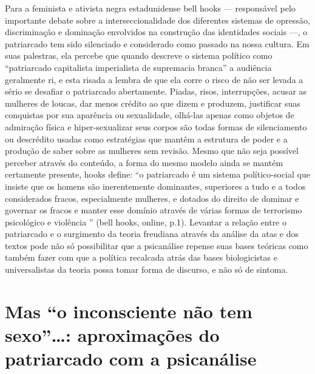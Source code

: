 Para a feminista e ativista negra estadunidense bell hooks --- responsável
pelo importante debate sobre a interseccionalidade dos diferentes
sistemas de opressão, discriminação e dominação envolvidos na construção
das identidades sociais ---, o patriarcado tem sido silenciado e
considerado como passado na nossa cultura. Em suas palestras, ela
percebe que quando descreve o sistema político como ``patriarcado
capitalista imperialista de supremacia branca'' a audiência geralmente
ri, e esta risada a lembra de que ela corre o risco de não ser levada a
sério se desafiar o patriarcado abertamente. Piadas, risos,
interrupções, acusar as mulheres de loucas, dar menos crédito ao que
dizem e produzem, justificar suas conquistas por sua aparência ou
sexualidade, olhá-las apenas como objetos de admiração física e
hiper-sexualizar seus corpos são todas formas de silenciamento ou
descrédito usadas como estratégias que mantêm a estrutura de poder e a
produção de saber sobre as mulheres sem revisão. Mesmo que não seja
possível perceber através do conteúdo, a forma do mesmo modelo ainda se
mantém certamente presente, hooks define: ``o patriarcado é um sistema
político-social que insiste que os homens são inerentemente dominantes,
superiores a tudo e a todos considerados fracos, especialmente mulheres,
e dotados do direito de dominar e governar os fracos e manter esse
domínio através de várias formas de terrorismo psicológico e violência
'' (bell hooks, online, p.1). Levantar a relação entre o patriarcado e o
surgimento da teoria freudiana através da análise da atas e dos textos
pode não só possibilitar que a psicanálise repense suas bases teóricas
como também fazer com que a política recalcada atrás das bases
biologicistas e universalistas da teoria possa tomar forma de discurso,
e não só de sintoma.

\section{Mas ``o inconsciente não tem sexo''\ldots{}: aproximações do
patriarcado com a psicanálise }


